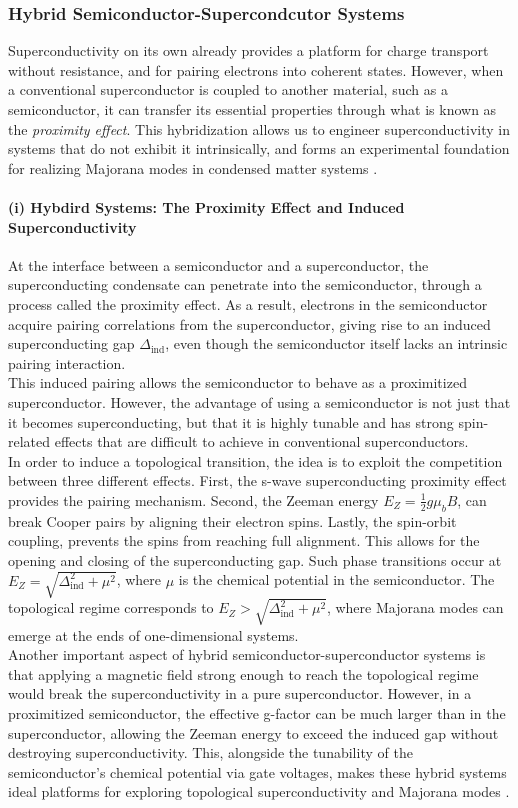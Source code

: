 \subsubsection{Hybrid Semiconductor-Supercondcutor Systems}
Superconductivity on its own already provides a platform for charge transport without resistance, and for pairing electrons into coherent states. However, when a conventional superconductor is coupled to another material, such as a semiconductor, it can transfer its essential properties through what is known as the \textit{proximity effect}. This hybridization allows us to engineer superconductivity in systems that do not exhibit it intrinsically, and forms an experimental foundation for realizing Majorana modes in condensed matter systems  \cite{Qtech}.
\paragraph{(i) Hybdird Systems:  The Proximity Effect and Induced Superconductivity}
At the interface between a semiconductor and a superconductor, the superconducting condensate can penetrate into the semiconductor, through a process called the proximity effect. As a result, electrons in the semiconductor acquire pairing correlations from the superconductor, giving rise to an induced superconducting gap $Δ_{\mathrm{ind}}$, even though the semiconductor itself lacks an intrinsic pairing interaction.\\
This induced pairing allows the semiconductor to behave as a proximitized superconductor. However, the advantage of using a semiconductor is not just that it becomes superconducting, but that it is highly tunable and has strong spin-related effects that are difficult to achieve in conventional superconductors.\\
In order to induce a topological transition, the idea is to exploit the competition between three different effects. First, the s-wave superconducting proximity effect provides the pairing mechanism. Second, the Zeeman energy $E_Z = \frac{1}{2} g μ_bB$, can break Cooper pairs by aligning their electron spins. Lastly, the spin-orbit coupling, prevents the spins from reaching full alignment. This allows for the opening and closing of the superconducting gap. Such phase transitions occur at $E_Z = \sqrt{Δ_{\mathrm{ind}}^2 + μ^2}$, where $μ$ is the chemical potential in the semiconductor. The topological regime corresponds to $E_Z > \sqrt{Δ_{\mathrm{ind}}^2 + μ^2}$, where Majorana modes can emerge at the ends of one-dimensional systems.\\
Another important aspect of hybrid semiconductor-superconductor systems is that applying a magnetic field strong enough to reach the topological regime would break the superconductivity in a pure superconductor. However, in a proximitized semiconductor, the effective g-factor can be much larger than in the superconductor, allowing the Zeeman energy to exceed the induced gap without destroying superconductivity. This, alongside the tunability of the semiconductor's chemical potential via gate voltages, makes these hybrid systems ideal platforms for exploring topological superconductivity and Majorana modes \cite{Qtech}.\\
